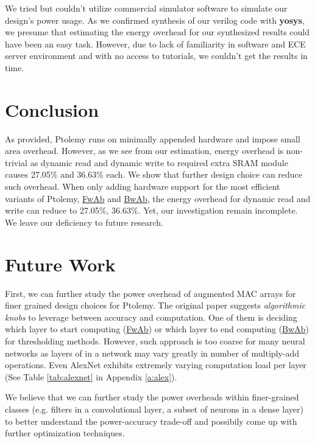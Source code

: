 \documentclass[11pt]{article}
\begin{document}
We tried but couldn't utilize commercial simulator software to simulate our design's power usage. As we confirmed synthesis of our verilog code with \textbf{yosys}, we presume that estimating the energy overhead for our synthesized results could have been an easy task. However, due to lack of familiarity in software and ECE server environment and with no access to tutorials, we couldn't get the results in time.

\section{Conclusion}

As \citeauthor{ptolemy} provided, Ptolemy runs on minimally appended hardware and impose small area overhead. However, as we see from our estimation, energy overhead is non-trivial as dynamic read and dynamic write to required extra SRAM module causes 27.05\% and 36.63\% each. We show that further design choice can reduce such overhead. When only adding hardware support for the most efficient variants of Ptolemy, \underline{FwAb} and \underline{BwAb}, the energy overhead for dynamic read and write can reduce to 27.05\%, 36.63\%. Yet, our investigation remain incomplete. We leave our deficiency to future research.

\section{Future Work}

First, we can further study the power overhead of augmented MAC arrays for finer grained design choices for Ptolemy. The original paper suggests \textit{algorithmic knobs} to leverage between accuracy and computation. One of them is deciding which layer to start computing (\underline{FwAb}) or which layer to end computing (\underline{BwAb}) for thresholding methods. However, such approach is too coarse for many neural networks as layers of in a network may vary greatly in number of multiply-add operations. Even AlexNet exhibits extremely varying computation load per layer (See Table \ref{tab:alexnet} in Appendix \ref{a:alex}).

We believe that we can further study the power overheads within finer-grained classes (e.g. filters in a convolutional layer, a subset of neurons in a dense layer) to better understand the power-accuracy trade-off and possibily come up with further optimization techniques.




\end{document}
